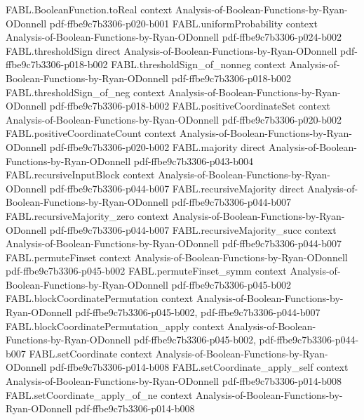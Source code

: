 \begin{theorem}
\proofstep
  {FABL.BooleanFunction.toReal}
  {context}
  {Analysis-of-Boolean-Functions-by-Ryan-ODonnell}
  {pdf-ffbe9c7b3306-p020-b001}
\proofstep
  {FABL.uniformProbability}
  {context}
  {Analysis-of-Boolean-Functions-by-Ryan-ODonnell}
  {pdf-ffbe9c7b3306-p024-b002}
\proofstep
  {FABL.thresholdSign}
  {direct}
  {Analysis-of-Boolean-Functions-by-Ryan-ODonnell}
  {pdf-ffbe9c7b3306-p018-b002}
\proofstep
  {FABL.thresholdSign_of_nonneg}
  {context}
  {Analysis-of-Boolean-Functions-by-Ryan-ODonnell}
  {pdf-ffbe9c7b3306-p018-b002}
\proofstep
  {FABL.thresholdSign_of_neg}
  {context}
  {Analysis-of-Boolean-Functions-by-Ryan-ODonnell}
  {pdf-ffbe9c7b3306-p018-b002}
\proofstep
  {FABL.positiveCoordinateSet}
  {context}
  {Analysis-of-Boolean-Functions-by-Ryan-ODonnell}
  {pdf-ffbe9c7b3306-p020-b002}
\proofstep
  {FABL.positiveCoordinateCount}
  {context}
  {Analysis-of-Boolean-Functions-by-Ryan-ODonnell}
  {pdf-ffbe9c7b3306-p020-b002}
\proofstep
  {FABL.majority}
  {direct}
  {Analysis-of-Boolean-Functions-by-Ryan-ODonnell}
  {pdf-ffbe9c7b3306-p043-b004}
\proofstep
  {FABL.recursiveInputBlock}
  {context}
  {Analysis-of-Boolean-Functions-by-Ryan-ODonnell}
  {pdf-ffbe9c7b3306-p044-b007}
\proofstep
  {FABL.recursiveMajority}
  {direct}
  {Analysis-of-Boolean-Functions-by-Ryan-ODonnell}
  {pdf-ffbe9c7b3306-p044-b007}
\proofstep
  {FABL.recursiveMajority_zero}
  {context}
  {Analysis-of-Boolean-Functions-by-Ryan-ODonnell}
  {pdf-ffbe9c7b3306-p044-b007}
\proofstep
  {FABL.recursiveMajority_succ}
  {context}
  {Analysis-of-Boolean-Functions-by-Ryan-ODonnell}
  {pdf-ffbe9c7b3306-p044-b007}
\proofstep
  {FABL.permuteFinset}
  {context}
  {Analysis-of-Boolean-Functions-by-Ryan-ODonnell}
  {pdf-ffbe9c7b3306-p045-b002}
\proofstep
  {FABL.permuteFinset_symm}
  {context}
  {Analysis-of-Boolean-Functions-by-Ryan-ODonnell}
  {pdf-ffbe9c7b3306-p045-b002}
\proofstep
  {FABL.blockCoordinatePermutation}
  {context}
  {Analysis-of-Boolean-Functions-by-Ryan-ODonnell}
  {pdf-ffbe9c7b3306-p045-b002,
    pdf-ffbe9c7b3306-p044-b007}
\proofstep
  {FABL.blockCoordinatePermutation_apply}
  {context}
  {Analysis-of-Boolean-Functions-by-Ryan-ODonnell}
  {pdf-ffbe9c7b3306-p045-b002,
    pdf-ffbe9c7b3306-p044-b007}
\proofstep
  {FABL.setCoordinate}
  {context}
  {Analysis-of-Boolean-Functions-by-Ryan-ODonnell}
  {pdf-ffbe9c7b3306-p014-b008}
\proofstep
  {FABL.setCoordinate_apply_self}
  {context}
  {Analysis-of-Boolean-Functions-by-Ryan-ODonnell}
  {pdf-ffbe9c7b3306-p014-b008}
\proofstep
  {FABL.setCoordinate_apply_of_ne}
  {context}
  {Analysis-of-Boolean-Functions-by-Ryan-ODonnell}
  {pdf-ffbe9c7b3306-p014-b008}

\end{theorem}
